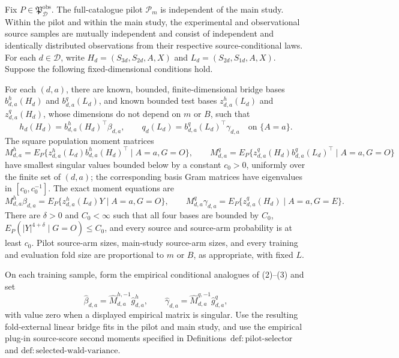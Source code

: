 Fix \(P\in\mathfrak P_{\mathcal D}^{\mathrm{obs}}\).  The full-catalogue pilot \(\mathcal P_m\) is independent of the main study.  Within the pilot and within the main study, the experimental and observational source samples are mutually independent and consist of independent and identically distributed observations from their respective source-conditional laws.  For each \(d\in\mathcal D\), write \(H_d=(S_{3d},S_{2d},A,X)\) and \(L_d=(S_{2d},S_{1d},A,X)\).  Suppose the following fixed-dimensional conditions hold.

For each \((d,a)\), there are known, bounded, finite-dimensional bridge bases \(b^h_{d,a}(H_d)\) and \(b^q_{d,a}(L_d)\), and known bounded test bases \(z^h_{d,a}(L_d)\) and \(z^q_{d,a}(H_d)\), whose dimensions do not depend on \(m\) or \(B\), such that
\[
 h_d(H_d)=b^h_{d,a}(H_d)^\top\beta_{d,a},
 \qquad
 q_d(L_d)=b^q_{d,a}(L_d)^\top\gamma_{d,a}
 \quad\text{on }\{A=a\}.                                    \tag{1}
\]
The square population moment matrices
\[
 M^h_{d,a}=E_P\{z^h_{d,a}(L_d)b^h_{d,a}(H_d)^\top\mid A=a,G=O\},
 \qquad
 M^q_{d,a}=E_P\{z^q_{d,a}(H_d)b^q_{d,a}(L_d)^\top\mid A=a,G=O\} \tag{2}
\]
have smallest singular values bounded below by a constant \(c_0>0\), uniformly over the finite set of \((d,a)\); the corresponding basis Gram matrices have eigenvalues in \([c_0,c_0^{-1}]\).  The exact moment equations are
\[
 M^h_{d,a}\beta_{d,a}
 =E_P\{z^h_{d,a}(L_d)Y\mid A=a,G=O\},
 \qquad
 M^q_{d,a}\gamma_{d,a}
 =E_P\{z^q_{d,a}(H_d)\mid A=a,G=E\}.                         \tag{3}
\]
There are \(\delta>0\) and \(C_0<\infty\) such that all four bases are bounded by \(C_0\), \(E_P(|Y|^{4+\delta}\mid G=O)\le C_0\), and every source and source-arm probability is at least \(c_0\).  Pilot source-arm sizes, main-study source-arm sizes, and every training and evaluation fold size are proportional to \(m\) or \(B\), as appropriate, with fixed \(L\).

On each training sample, form the empirical conditional analogues of (2)--(3) and set
\[
 \widehat\beta_{d,a}=\widehat M_{d,a}^{h,-1}\widehat g^h_{d,a},
 \qquad
 \widehat\gamma_{d,a}=\widehat M_{d,a}^{q,-1}\widehat g^q_{d,a}, \tag{4}
\]
with value zero when a displayed empirical matrix is singular.  Use the resulting fold-external linear bridge fits in the pilot and main study, and use the empirical plug-in source-score second moments specified in Definitions~\(\mathrm{def{:}pilot\text{-}selector}\) and \(\mathrm{def{:}selected\text{-}wald\text{-}variance}\).

